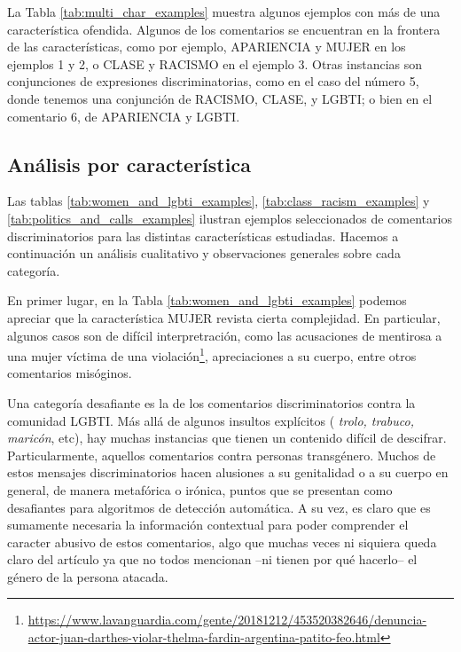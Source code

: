 La Tabla \ref{tab:multi_char_examples} muestra algunos ejemplos con más de una característica ofendida. Algunos de los comentarios se encuentran en la frontera de las características, como por ejemplo, APARIENCIA y MUJER en los ejemplos 1 y 2, o CLASE y RACISMO en el ejemplo 3. Otras instancias son conjunciones de expresiones discriminatorias, como en el caso del número 5, donde tenemos una conjunción de RACISMO, CLASE, y LGBTI; o bien en el comentario 6, de APARIENCIA y LGBTI.



\subsection{Análisis por característica}
\label{sec:analisis_dataset_por_caracteristica}



Las tablas \ref{tab:women_and_lgbti_examples}, \ref{tab:class_racism_examples} y \ref{tab:politics_and_calls_examples} ilustran ejemplos seleccionados de comentarios discriminatorios para las distintas características estudiadas. Hacemos a continuación un análisis cualitativo y observaciones generales sobre cada categoría.

En primer lugar, en la Tabla \ref{tab:women_and_lgbti_examples} podemos apreciar que la característica MUJER revista cierta complejidad. En particular, algunos casos son de difícil interpretración, como las acusaciones de mentirosa a una mujer víctima de una violación\footnote{\url{https://www.lavanguardia.com/gente/20181212/453520382646/denuncia-actor-juan-darthes-violar-thelma-fardin-argentina-patito-feo.html}}, apreciaciones a su cuerpo, entre otros comentarios misóginos.

Una categoría desafiante es la de los comentarios discriminatorios contra la comunidad LGBTI. Más allá de algunos insultos explícitos ( \emph{trolo, trabuco, maricón}, etc), hay muchas instancias que tienen un contenido difícil de descifrar. Particularmente, aquellos comentarios contra personas transgénero. Muchos de estos mensajes discriminatorios hacen alusiones a su genitalidad o a su cuerpo en general, de manera metafórica o irónica, puntos que se presentan como desafiantes para algoritmos de detección automática. A su vez, es claro que es sumamente necesaria la información contextual para poder comprender el caracter abusivo de estos comentarios, algo que muchas veces ni siquiera queda claro del artículo ya que no todos mencionan --ni tienen por qué hacerlo-- el género de la persona atacada.

